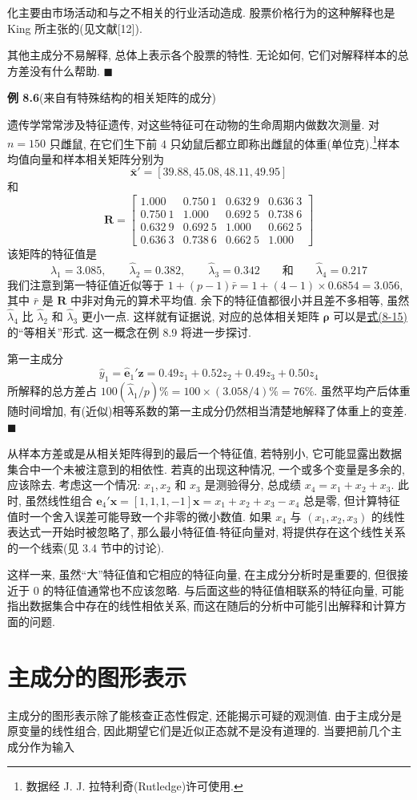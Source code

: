 
化主要由市场活动和与之不相关的行业活动造成. 股票价格行为的这种解释也是 King 所主张的(见文献[12]).

其他主成分不易解释, 总体上表示各个股票的特性. 无论如何, 它们对解释样本的总方差没有什么帮助. \hfill$\blacksquare$

\noindent\textbf{例 8.6}\quad (来自有特殊结构的相关矩阵的成分)

遗传学常常涉及特征遗传, 对这些特征可在动物的生命周期内做数次测量. 对 $n=150$ 只雌鼠, 在它们生下前 4 只幼鼠后都立即称出雌鼠的体重(单位克).\footnote{{\footnotesize 数据经 J. J. 拉特利奇(Rutledge)许可使用.}}样本均值向量和样本相关矩阵分别为
\[
\bar{\mathbf{x}}'=[39.88,45.08,48.11,49.95]
\]
和
\[
\mathbf{R}=\begin{bmatrix}
1.000&0.750\ 1&0.632\ 9&0.636\ 3\\
0.750\ 1&1.000&0.692\ 5&0.738\ 6\\
0.632\ 9&0.692\ 5&1.000&0.662\ 5\\
0.636\ 3&0.738\ 6&0.662\ 5&1.000
\end{bmatrix}
\]
该矩阵的特征值是
\[
\hat{\lambda}_1=3.085,\qquad \hat{\lambda}_2=0.382,\qquad \hat{\lambda}_3=0.342\qquad\text{和}\qquad \hat{\lambda}_4=0.217
\]
我们注意到第一特征值近似等于 $1+(p-1)\bar{r}=1+(4-1)\times 0.6854=3.056$, 其中 $\bar{r}$ 是 $\mathbf{R}$ 中非对角元的算术平均值. 余下的特征值都很小并且差不多相等, 虽然 $\hat{\lambda}_4$ 比 $\hat{\lambda}_2$ 和 $\hat{\lambda}_3$ 更小一点. 这样就有证据说, 对应的总体相关矩阵 $\boldsymbol{\rho}$ 可以是\hyperref[eq:8-15]{式(8-15)}的“等相关”形式. 这一概念在例 8.9 将进一步探讨.

第一主成分
\[
\hat{y}_1=\hat{\mathbf{e}}_1'\mathbf{z}=0.49z_1+0.52z_2+0.49z_3+0.50z_4
\]
所解释的总方差占 $100(\hat{\lambda}_1/p)\%=100\times(3.058/4)\%=76\%$. 虽然平均产后体重随时间增加, 有(近似)相等系数的第一主成分仍然相当清楚地解释了体重上的变差. \hfill$\blacksquare$

\quad 从样本方差或是从相关矩阵得到的最后一个特征值, 若特别小, 它可能显露出数据集合中一个未被注意到的相依性. 若真的出现这种情况, 一个或多个变量是多余的, 应该除去. 考虑这一个情况: $x_1, x_2$ 和 $x_3$ 是测验得分, 总成绩 $x_4=x_1+x_2+x_3$. 此时, 虽然线性组合 $\mathbf{e}_4'\mathbf{x}=[1,1,1,-1]\mathbf{x}=x_1+x_2+x_3-x_4$ 总是零, 但计算特征值时一个舍入误差可能导致一个非零的微小数值. 如果 $x_4$ 与 $(x_1,x_2,x_3)$ 的线性表达式一开始时被忽略了, 那么最小特征值-特征向量对, 将提供存在这个线性关系的一个线索(见 3.4 节中的讨论).

这样一来, 虽然“大”特征值和它相应的特征向量, 在主成分分析时是重要的, 但很接近于 0 的特征值通常也不应该忽略. 与后面这些的特征值相联系的特征向量, 可能指出数据集合中存在的线性相依关系, 而这在随后的分析中可能引出解释和计算方面的问题.

\section{主成分的图形表示}  %
\label{sec:8.4}

主成分的图形表示除了能核查正态性假定, 还能揭示可疑的观测值. 由于主成分是原变量的线性组合, 因此期望它们是近似正态就不是没有道理的. 当要把前几个主成分作为输入
